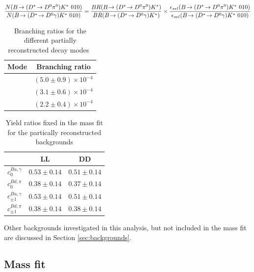 \begin{equation}
\frac{N(\decay{\B}{(\decay{\Dstar}{\Dz\piz})\Kstar}\ 010)}{N(\decay{\B}{(\decay{\Dstar}{\Dz\gamma})\Kstar}\ 010)} = \frac{BR(\decay{\B}{(\decay{\Dstar}{\Dz\piz})\Kstar})}{BR(\decay{\B}{(\decay{\Dstar}{\Dz\gamma})\Kstar})} \times \frac{\epsilon_{sel}(\decay{\B}{(\decay{\Dstar}{\Dz\piz})\Kstar}\ 010)}{\epsilon_{sel}(\decay{\B}{(\decay{\Dstar}{\Dz\gamma})\Kstar}\ 010)}
\label{partrecoexample}
\end{equation}

\begin{table}[h]
\centering
\begin{tabular}{c|c}
Mode & Branching ratio \\
\hline
\decay{\Bm}{(\decay{\Dstarz}{\Dz[\piz]})\Kstarm} & $(5.0 \pm 0.9) \times 10^{-4}$ \\
\decay{\Bm}{(\decay{\Dstarz}{\Dz[\gamma]})\Kstarm} & $(3.1 \pm 0.6) \times 10^{-4}$ \\
\decay{\Bd}{(\decay{\Dstarp}{\Dz[\pip]})\Kstarm} & $(2.2 \pm 0.4) \times 10^{-4}$ \\
\end{tabular}
\caption{Branching ratios for the different partially reconstructed decay modes~\cite{PDG2014}}
\label{partrecoBRs}
\end{table}

\begin{table}[h]
\centering
\begin{tabular}{ccc}
\hline
& LL & DD \\
\hline
$c^{Bu,\gamma}_0$ & $0.53 \pm 0.14$ & $0.51 \pm 0.14$ \\[3mm]
$c^{Bd,\pi}_0$ & $0.38 \pm 0.14$ & $0.37 \pm 0.14$ \\[3mm]
$c^{Bu,\gamma}_{\pm 1}$ & $0.53 \pm 0.14$ & $0.51 \pm 0.14$ \\[3mm]
$c^{Bd,\pi}_{\pm 1}$ & $0.38 \pm 0.14$ & $0.38 \pm 0.14$ \\[3mm]
\hline
\end{tabular}
\caption{Yield ratios fixed in the mass fit for the partically reconstructed backgrounds}
\label{fixedyieldratios}
\end{table}

Other backgrounds investigated in this analysis, but not included in the mass fit are discussed in Section \ref{sec:backgrounds}.


\subsection{Mass fit}
\label{sec:massfit:fit}

